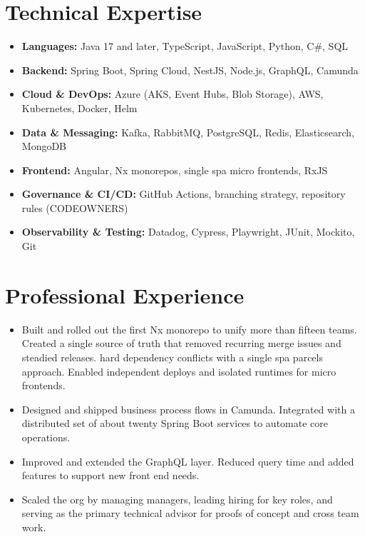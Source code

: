\section*{Technical Expertise}
\begin{itemize}[leftmargin=0pt, label={}]
    \item \textbf{Languages:} Java 17 and later, TypeScript, JavaScript, Python, C\#, SQL
    \item \textbf{Backend:} Spring Boot, Spring Cloud, NestJS, Node.js, GraphQL, Camunda
    \item \textbf{Cloud \& DevOps:} Azure (AKS, Event Hubs, Blob Storage), AWS, Kubernetes, Docker, Helm
    \item \textbf{Data \& Messaging:} Kafka, RabbitMQ, PostgreSQL, Redis, Elasticsearch, MongoDB
    \item \textbf{Frontend:} Angular, Nx monorepos, single spa micro frontends, RxJS
    \item \textbf{Governance \& CI/CD:} GitHub Actions, branching strategy, repository rules (CODEOWNERS)
    \item \textbf{Observability \& Testing:} Datadog, Cypress, Playwright, JUnit, Mockito, Git
\end{itemize}
\vspace{1em}



\section*{Professional Experience}

\begin{itemize}[leftmargin=*]
    \item
    Built and rolled out the first Nx monorepo to unify more than fifteen teams. Created a single source of truth that
    removed recurring merge issues and steadied releases.
    \itemResolved hard dependency conflicts with a single spa parcels approach. Enabled independent deploys and isolated
    runtimes for micro frontends.
    \item
    Designed and shipped business process flows in Camunda. Integrated with a distributed set of about twenty Spring
    Boot services to automate core operations.
    \item Improved and extended the GraphQL layer. Reduced query time and added features to support new front end needs.
    \item
    Scaled the org by managing managers, leading hiring for key roles, and serving as the primary technical advisor for
    proofs of concept and cross team work.
\end{itemize}
\vspace{\jobGroupBottomMargin}

